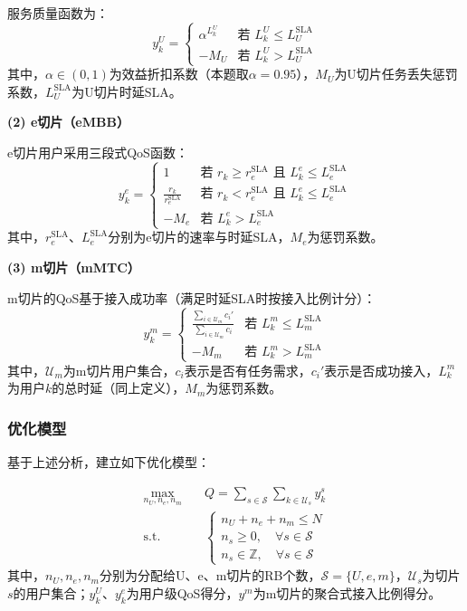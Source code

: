 服务质量函数为：
\begin{equation}
y_k^{U} = \begin{cases}
\alpha^{L_k^{U}} & \text{若 } L_k^{U} \leq L_{U}^{\text{SLA}} \\
-M_{U} & \text{若 } L_k^{U} > L_{U}^{\text{SLA}}
\end{cases}
\end{equation}
其中，$\alpha\in(0,1)$为效益折扣系数（本题取$\alpha=0.95$），$M_U$为U切片任务丢失惩罚系数，$L_U^{\text{SLA}}$为U切片时延SLA。

\textbf{(2) e切片（eMBB）}

e切片用户采用三段式QoS函数：
\begin{equation}
y_k^{e} = \begin{cases}
1 & \text{若 } r_k \geq r_{e}^{\text{SLA}} \text{ 且 } L_k^{e} \leq L_{e}^{\text{SLA}} \\
\frac{r_k}{r_{e}^{\text{SLA}}} & \text{若 } r_k < r_{e}^{\text{SLA}} \text{ 且 } L_k^{e} \leq L_{e}^{\text{SLA}} \\
-M_{e} & \text{若 } L_k^{e} > L_{e}^{\text{SLA}}
\end{cases}
\end{equation}
其中，$r_e^{\text{SLA}}$、$L_e^{\text{SLA}}$分别为e切片的速率与时延SLA，$M_e$为惩罚系数。

\textbf{(3) m切片（mMTC）}

m切片的QoS基于接入成功率（满足时延SLA时按接入比例计分）：
\begin{equation}
y_k^{m} = \begin{cases}
\frac{\sum_{i \in \mathcal{U}_{m}} c_i'}{\sum_{i \in \mathcal{U}_{m}} c_i} & \text{若 } L_k^{m} \le L_{m}^{\text{SLA}} \\
-M_{m} & \text{若 } L_k^{m} > L_{m}^{\text{SLA}}
\end{cases}
\end{equation}
其中，$\mathcal{U}_m$为m切片用户集合，$c_i$表示是否有任务需求，$c_i'$表示是否成功接入，$L_k^{m}$为用户$k$的总时延（同上定义），$M_m$为惩罚系数。

\subsubsection{优化模型}

基于上述分析，建立如下优化模型：

\begin{equation}
\begin{aligned}
\max_{n_U, n_e, n_m} \quad & Q = \sum_{s \in \mathcal{S}} \sum_{k \in \mathcal{U}_s} y_k^s \\
\text{s.t.} \quad & \begin{cases}
 n_U + n_e + n_m \leq N \\
 n_s \geq 0, \quad \forall s \in \mathcal{S} \\
 n_s \in \mathbb{Z}, \quad \forall s \in \mathcal{S}
 \end{cases}
 \end{aligned}
 \end{equation}
其中，$n_U, n_e, n_m$分别为分配给U、e、m切片的RB个数，$\mathcal{S}=\{U,e,m\}$，$\mathcal{U}_s$为切片$s$的用户集合；$y_k^{U}$、$y_k^{e}$为用户级QoS得分，$y^{m}$为m切片的聚合式接入比例得分。

